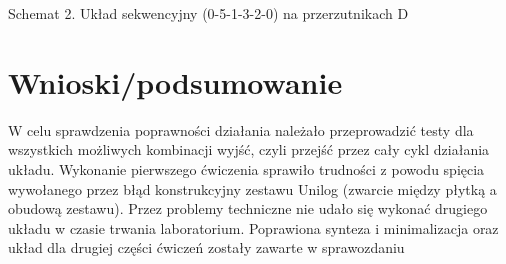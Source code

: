 \documentclass[12pt,a4paper]{article}
\begin{document}
			\vspace{0.5cm}
			\begin{center}
				Schemat 2. Układ sekwencyjny (0-5-1-3-2-0) na przerzutnikach D
			\end{center}

	\section{Wnioski/podsumowanie}
	
		W celu sprawdzenia poprawności działania należało przeprowadzić testy dla wszystkich możliwych kombinacji wyjść, czyli
		przejść przez cały cykl działania układu. Wykonanie pierwszego ćwiczenia sprawiło trudności z powodu spięcia wywołanego 
		przez błąd konstrukcyjny zestawu Unilog (zwarcie między płytką a obudową zestawu). Przez problemy techniczne nie udało się
		wykonać drugiego układu w czasie trwania laboratorium. Poprawiona synteza i minimalizacja oraz układ dla drugiej części
		ćwiczeń zostały zawarte w sprawozdaniu 
\end{document}
